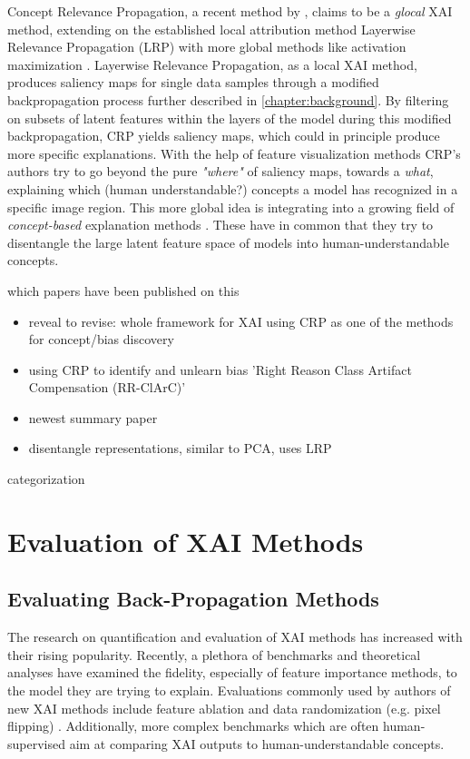 Concept Relevance Propagation, a recent method by \cite{Achtibat2022}, claims to be a \textit{glocal} XAI method, extending on the established local attribution method Layerwise Relevance Propagation (LRP) \cite{Bach2015} with more global methods like activation maximization .
Layerwise Relevance Propagation, as a local XAI method, produces saliency maps for single data samples through a modified backpropagation process further described in \autoref{chapter:background}. By filtering on subsets of latent features within the layers of the model during this modified backpropagation, CRP yields saliency maps, which could in principle produce more specific explanations. With the help of feature visualization methods CRP's authors try to go beyond the pure \textit{"where"} of saliency maps, towards a \textit{what}, explaining which (human understandable?) concepts a model has recognized in a specific image region. This more global idea is integrating into a growing field of \textit{concept-based} explanation methods .
These have in common that they try to disentangle the large latent feature space of models into human-understandable concepts.


which papers have been published on this
\begin{itemize}
      \item reveal to revise: whole framework for XAI using CRP as one of the methods for concept/bias discovery \cite{Pahde2023}
      \item using CRP to identify and unlearn bias 'Right Reason Class Artifact Compensation (RR-ClArC)' \cite{Dreyer2023a}
      \item newest summary paper \cite{Achtibat2023}
      \item disentangle representations, similar to PCA, uses LRP \cite{Chormai2022}
\end{itemize}

categorization \cite{Samek2021}


\section{Evaluation of XAI Methods}



\subsection{Evaluating Back-Propagation Methods}
\label{subsection:evaluation_critique}
The research on quantification and evaluation of XAI methods has increased with their rising popularity. Recently, a plethora of benchmarks and theoretical analyses have examined the fidelity, especially of feature importance methods, to the model they are trying to explain. Evaluations commonly used by authors of new XAI methods include feature ablation and data randomization (e.g. pixel flipping) . Additionally, more complex benchmarks \cite{Kim2018, Arras2022, Bau2017, Singla2022} which are often human-supervised aim at comparing XAI outputs to human-understandable concepts.

